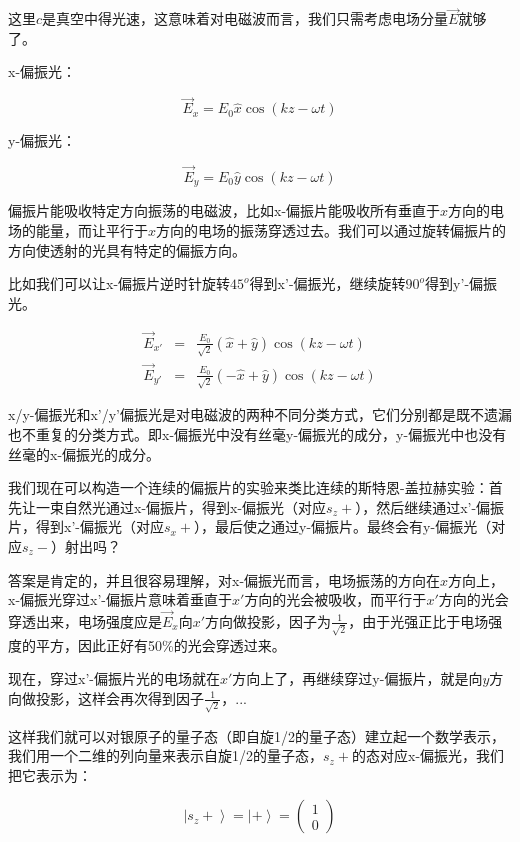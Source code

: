 这里$c$是真空中得光速，这意味着对电磁波而言，我们只需考虑电场分量$\vec E$就够了。

x-偏振光：

\begin{equation}
\vec E_x = E_0 \hat x \cos (k z - \omega t )
\end{equation}

y-偏振光：

\begin{equation}
\vec E_y = E_0 \hat y \cos (k z - \omega t )
\end{equation}

偏振片能吸收特定方向振荡的电磁波，比如x-偏振片能吸收所有垂直于$x$方向的电场的能量，而让平行于$x$方向的电场的振荡穿透过去。我们可以通过旋转偏振片的方向使透射的光具有特定的偏振方向。

比如我们可以让x-偏振片逆时针旋转$45^o$得到x'-偏振光，继续旋转$90^o$得到y'-偏振光。

\begin{eqnarray}
\vec E_{x'} & = & \frac{E_0}{\sqrt 2} (\hat x + \hat y)  \cos (k z - \omega t ) \\
\vec E_{y'} & = & \frac{E_0}{\sqrt 2} ( - \hat x + \hat y)  \cos (k z - \omega t )
\end{eqnarray}

x/y-偏振光和x'/y'偏振光是对电磁波的两种不同分类方式，它们分别都是既不遗漏也不重复的分类方式。即x-偏振光中没有丝毫y-偏振光的成分，y-偏振光中也没有丝毫的x-偏振光的成分。

我们现在可以构造一个连续的偏振片的实验来类比连续的斯特恩-盖拉赫实验：首先让一束自然光通过x-偏振片，得到x-偏振光（对应$s_z +$），然后继续通过x'-偏振片，得到x'-偏振光（对应$s_x +$），最后使之通过y-偏振片。最终会有y-偏振光（对应$s_z -$）射出吗？

答案是肯定的，并且很容易理解，对x-偏振光而言，电场振荡的方向在$x$方向上，x-偏振光穿过x'-偏振片意味着垂直于$x'$方向的光会被吸收，而平行于$x'$方向的光会穿透出来，电场强度应是$\vec E_x$向$x'$方向做投影，因子为$\frac{1}{\sqrt 2}$，由于光强正比于电场强度的平方，因此正好有50\%的光会穿透过来。

现在，穿过x'-偏振片光的电场就在$x'$方向上了，再继续穿过y-偏振片，就是向$y$方向做投影，这样会再次得到因子$\frac{1}{\sqrt 2}$，...

这样我们就可以对银原子的量子态（即自旋1/2的量子态）建立起一个数学表示，我们用一个二维的列向量来表示自旋1/2的量子态，$s_z +$的态对应x-偏振光，我们把它表示为：

\begin{equation}
\left| s_z + \right\rangle = \left| + \right\rangle = \left( \begin{array}{cc} 1 \\ 0 \end{array} \right)
\end{equation}

